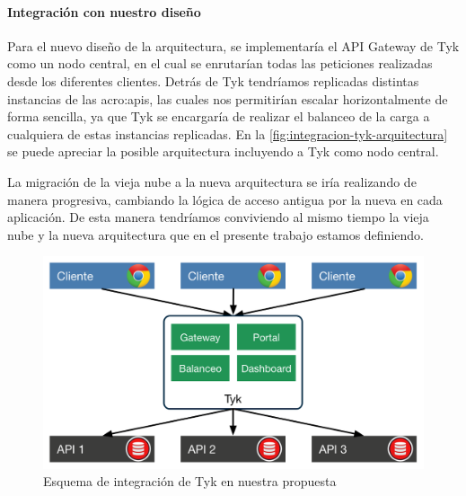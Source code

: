\paragraph{Integración con nuestro diseño}

Para el nuevo diseño de la arquitectura, se implementaría el API Gateway de Tyk como un nodo central, en el cual se enrutarían todas las peticiones realizadas desde los diferentes clientes.  Detrás de Tyk tendríamos replicadas distintas instancias de las \glspl{acro:api}, las cuales nos permitirían escalar horizontalmente de forma sencilla, ya que Tyk se encargaría de realizar el balanceo de la carga a cualquiera de estas instancias replicadas. En la \autoref{fig:integracion-tyk-arquitectura} se puede apreciar la posible arquitectura incluyendo a Tyk como nodo central.

La migración de la vieja nube a la nueva arquitectura se iría realizando de manera progresiva, cambiando la lógica de acceso antigua por la nueva en cada aplicación.  De esta manera tendríamos conviviendo al mismo tiempo la vieja nube y la nueva arquitectura que en el presente trabajo estamos definiendo.

\begin{figure}[H]
  \includegraphics[width=\linewidth]{src/images/03-capitulo-3/tecnologias/tyk/tyk-integracion-arquitectura.png}
  \caption{Esquema de integración de Tyk en nuestra propuesta}
  \label{fig:integracion-tyk-arquitectura}
\end{figure}
